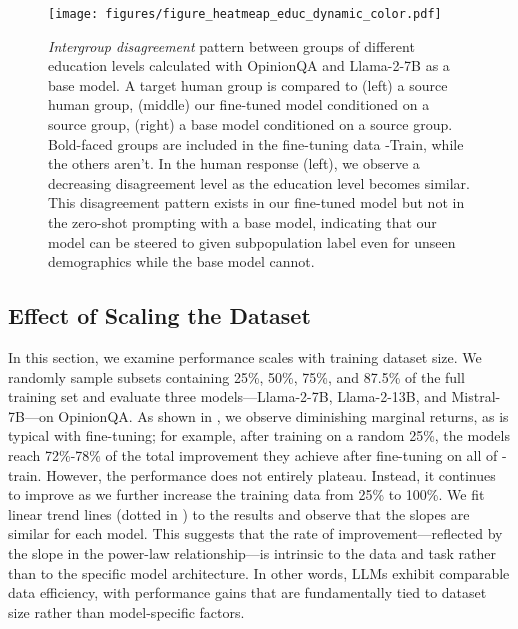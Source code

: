 \begin{figure*}[!t]
    \centering
    \captionsetup{font=small}
    \texttt{[image: figures/figure\_heatmeap\_educ\_dynamic\_color.pdf]}
    \caption{
    \textit{Intergroup disagreement} pattern between groups of different education levels calculated with OpinionQA and Llama-2-7B as a base model.
    A target human group is compared to
    (left) a source human group,
    (middle) our fine-tuned model conditioned on a source group,
    (right) a base model conditioned on a source group.
    Bold-faced groups are included in the fine-tuning data \OURDATA-Train, while the others aren't. In the human response (left), we observe a decreasing disagreement level as the education level becomes similar. This disagreement pattern exists in our fine-tuned model but not in the zero-shot prompting with a base model, indicating that our model can be steered to given subpopulation label even for unseen demographics while the base model cannot.
    }
    \label{fig:educ_heatmap}
\end{figure*}
\subsection{Effect of Scaling the Dataset}
\label{section_experiments_scaling}
In this section, we examine performance scales with training dataset size. 
We randomly sample subsets containing 25\%, 50\%, 75\%, and 87.5\% of the full \OURDATA training set and evaluate three models—Llama-2-7B, Llama-2-13B, and Mistral-7B—on OpinionQA. 
As shown in , we observe diminishing marginal returns, as is typical with fine-tuning; for example, after training on a random 25\%, the models reach 72\%-78\% of the total improvement they achieve after fine-tuning on all of \OURDATA-train. However, the performance does not entirely plateau. Instead, it continues to improve as we further increase the training data from 25\% to 100\%. %
We fit linear trend lines (dotted in ) to the results and observe that the slopes are similar for each model. 
This suggests that the rate of improvement—reflected by the slope in the power-law relationship—is intrinsic to the data and task rather than to the specific model architecture. 
In other words, LLMs exhibit comparable data efficiency, with performance gains that are fundamentally tied to dataset size rather than model-specific factors.

